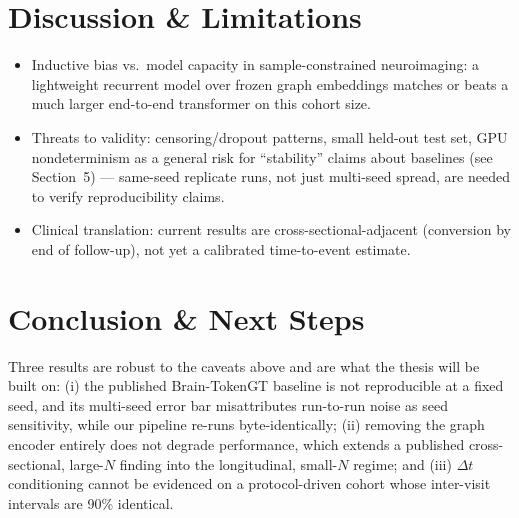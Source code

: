 \documentclass[11pt,a4paper]{article}
\begin{document}
\section{Discussion \& Limitations}
\begin{itemize}
  \item Inductive bias vs.\ model capacity in sample-constrained
    neuroimaging: a lightweight recurrent model over frozen graph embeddings
    matches or beats a much larger end-to-end transformer on this cohort
    size.
  \item Threats to validity: censoring/dropout patterns, small held-out test
    set, GPU nondeterminism as a general risk for ``stability'' claims about
    baselines (see Section~5) --- same-seed replicate runs, not just
    multi-seed spread, are needed to verify reproducibility claims.
  \item Clinical translation: current results are cross-sectional-adjacent
    (conversion by end of follow-up), not yet a calibrated time-to-event
    estimate.
\end{itemize}

\section{Conclusion \& Next Steps}

Three results are robust to the caveats above and are what the thesis will be built on:
(i) the published Brain-TokenGT baseline is not reproducible at a fixed seed, and its
multi-seed error bar misattributes run-to-run noise as seed sensitivity, while our pipeline
re-runs byte-identically; (ii) removing the graph encoder entirely does not degrade
performance, which extends a published cross-sectional, large-$N$ finding into the
longitudinal, small-$N$ regime; and (iii) $\Delta t$ conditioning cannot be evidenced on a
protocol-driven cohort whose inter-visit intervals are 90\% identical.
\end{document}
